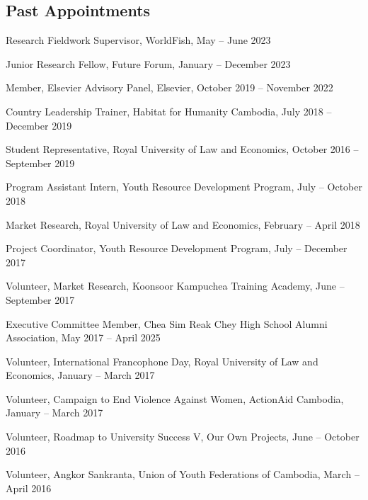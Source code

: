 \documentclass[10pt,a4paper]{article}
\begin{document}
\subsection*{Past Appointments}

	
	Research Fieldwork Supervisor, WorldFish, May -- June 2023

	Junior Research Fellow, Future Forum, January -- December 2023
	
	Member, Elsevier Advisory Panel, Elsevier, October 2019 -- November 2022
	
	Country Leadership Trainer, Habitat for Humanity Cambodia, July 2018 -- December 2019
	
	Student Representative, Royal University of Law and Economics, October 2016 -- September 2019
	
	Program Assistant Intern, Youth Resource Development Program, July -- October 2018
	
	Market Research, Royal University of Law and Economics, February -- April 2018
	
	Project Coordinator, Youth Resource Development Program, July -- December 2017
	
	Volunteer, Market Research, Koonsoor Kampuchea Training Academy, June -- September 2017
	
	Executive Committee Member, Chea Sim Reak Chey High School Alumni Association, May 2017 – April 2025
	
	Volunteer, International Francophone Day,  Royal University of Law and Economics, January -- March 2017
	
	Volunteer, Campaign to End Violence Against Women, ActionAid Cambodia, January -- March 2017
	
	Volunteer, Roadmap to University Success V, Our Own Projects, June -- October 2016
	
	Volunteer, Angkor Sankranta, Union of Youth Federations of Cambodia, March -- April 2016




\end{document}
